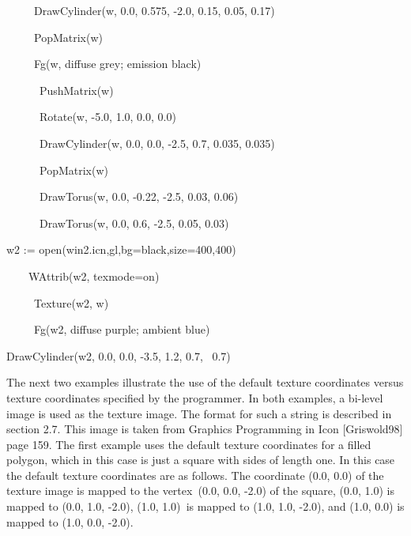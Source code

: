 \documentclass[letterpaper]{article}
\begin{document}
{{\sffamily
\ \ \ \ \ DrawCylinder(w, 0.0, 0.575, -2.0, 0.15, 0.05, 0.17)}

{\sffamily
\ \ \ \ \ PopMatrix(w) \ }

{\sffamily
\ \ \ \ \ Fg(w, {\textquotedbl}diffuse grey; emission black{\textquotedbl})}

{\sffamily
\ \ \ \ \ \ PushMatrix(w)}

{\sffamily
\ \ \ \ \ \ Rotate(w, -5.0, 1.0, 0.0, 0.0)}

{\sffamily
\ \ \ \ \ \ DrawCylinder(w, 0.0, 0.0, -2.5, 0.7, 0.035, 0.035)}

{\sffamily
\ \ \ \ \ \ PopMatrix(w) \ \ \ \ \ \ \ }

{\sffamily
\ \ \ \ \ \ DrawTorus(w, 0.0, -0.22, -2.5, 0.03, 0.06)}

{\sffamily
\ \ \ \ \ \ DrawTorus(w, 0.0, 0.6, -2.5, 0.05, 0.03)}


\bigskip

{\sffamily
w2 :=
open({\textquotedbl}win2.icn{\textquotedbl},{\textquotedbl}gl{\textquotedbl},{\textquotedbl}bg=black{\textquotedbl},{\textquotedbl}size=400,400{\textquotedbl})}

{\sffamily
\ \ \ \ WAttrib(w2, {\textquotedbl}texmode=on{\textquotedbl})}

{\sffamily
\ \ \ \ \ Texture(w2, w) }

{\sffamily
\ \ \ \ \ Fg(w2, {\textquotedbl}diffuse purple; ambient blue{\textquotedbl}) }

{\sffamily
DrawCylinder(w2, 0.0, 0.0, -3.5, 1.2, 0.7, \ 0.7)}


\bigskip

The next two examples illustrate the use of the default texture
coordinates versus texture coordinates specified by the programmer. In
both examples, a bi-level image is used as the texture image. The
format for such a string is described in section 2.7. This image is
taken from Graphics Programming in Icon [Griswold98] page 159. The
first example uses the default texture coordinates for a filled
polygon, which in this case is just a square with sides of length
one. In this case the default texture coordinates are as follows. The
coordinate \textsf{(0.0, 0.0) }of the texture image is mapped to the
vertex\texttt{ }\textsf{(0.0, 0.0, -2.0)} of the square, \textsf{(0.0,
  1.0) }is mapped to \textsf{(0.0, 1.0, -2.0), (1.0, 1.0)}\texttt{ }is
mapped to \textsf{(1.0, 1.0, -2.0)}, and \textsf{(1.0, 0.0) }is mapped
to \textsf{(1.0, 0.0, -2.0)}.


}
\end{document}
